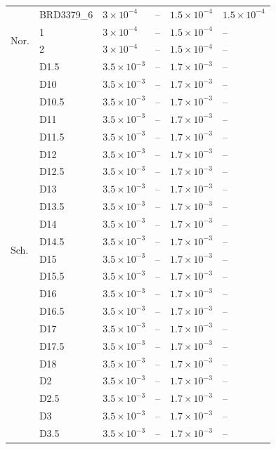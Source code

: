 \begin{tabular}{llllll}
 & BRD3379_6 & $3\times10^{-4}$ & -- & $1.5\times10^{-4}$ & $1.5\times10^{-4}$ \\
\cline{1-6}
\multirow[t]{2}{*}{Nor.} & 1 & $3\times10^{-4}$ & -- & $1.5\times10^{-4}$ & -- \\
 & 2 & $3\times10^{-4}$ & -- & $1.5\times10^{-4}$ & -- \\
\cline{1-6}
\multirow[t]{34}{*}{Sch.} & D1.5 & $3.5\times10^{-3}$ & -- & $1.7\times10^{-3}$ & -- \\
 & D10 & $3.5\times10^{-3}$ & -- & $1.7\times10^{-3}$ & -- \\
 & D10.5 & $3.5\times10^{-3}$ & -- & $1.7\times10^{-3}$ & -- \\
 & D11 & $3.5\times10^{-3}$ & -- & $1.7\times10^{-3}$ & -- \\
 & D11.5 & $3.5\times10^{-3}$ & -- & $1.7\times10^{-3}$ & -- \\
 & D12 & $3.5\times10^{-3}$ & -- & $1.7\times10^{-3}$ & -- \\
 & D12.5 & $3.5\times10^{-3}$ & -- & $1.7\times10^{-3}$ & -- \\
 & D13 & $3.5\times10^{-3}$ & -- & $1.7\times10^{-3}$ & -- \\
 & D13.5 & $3.5\times10^{-3}$ & -- & $1.7\times10^{-3}$ & -- \\
 & D14 & $3.5\times10^{-3}$ & -- & $1.7\times10^{-3}$ & -- \\
 & D14.5 & $3.5\times10^{-3}$ & -- & $1.7\times10^{-3}$ & -- \\
 & D15 & $3.5\times10^{-3}$ & -- & $1.7\times10^{-3}$ & -- \\
 & D15.5 & $3.5\times10^{-3}$ & -- & $1.7\times10^{-3}$ & -- \\
 & D16 & $3.5\times10^{-3}$ & -- & $1.7\times10^{-3}$ & -- \\
 & D16.5 & $3.5\times10^{-3}$ & -- & $1.7\times10^{-3}$ & -- \\
 & D17 & $3.5\times10^{-3}$ & -- & $1.7\times10^{-3}$ & -- \\
 & D17.5 & $3.5\times10^{-3}$ & -- & $1.7\times10^{-3}$ & -- \\
 & D18 & $3.5\times10^{-3}$ & -- & $1.7\times10^{-3}$ & -- \\
 & D2 & $3.5\times10^{-3}$ & -- & $1.7\times10^{-3}$ & -- \\
 & D2.5 & $3.5\times10^{-3}$ & -- & $1.7\times10^{-3}$ & -- \\
 & D3 & $3.5\times10^{-3}$ & -- & $1.7\times10^{-3}$ & -- \\
 & D3.5 & $3.5\times10^{-3}$ & -- & $1.7\times10^{-3}$ & -- \\

\end{tabular}
